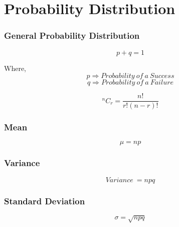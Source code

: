 \newpage
\section{Probability Distribution}

\subsubsection{General Probability Distribution}
\[p + q = 1\]

Where, \\
\[p \Rightarrow Probability\ of\ a\ Success\]
\[q \Rightarrow Probability\ of\ a\ Failure\]

\[{}^{n}C_{r} = \frac{n!}{r!(n-r)!}\]

\subsubsection{Mean}
\[\mu = np\]

\subsubsection{Variance}
\[Variance\ = npq\]

\subsubsection{Standard Deviation}
\[\sigma = \sqrt{npq}\]






